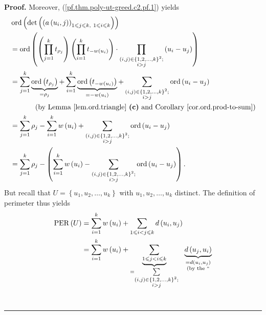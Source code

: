 \documentclass[numbers=enddot,12pt,final,onecolumn,notitlepage]{scrartcl}%
\theoremstyle{definition}
\newenvironment{proof}[1][Proof]{\noindent\textbf{#1.} }{\ \rule{0.5em}{0.5em}}
\let\sumnonlimits\sum
\let\prodnonlimits\prod
\renewcommand{\sum}{\sumnonlimits\limits}
\renewcommand{\prod}{\prodnonlimits\limits}
\renewcommand{\leq}{\leqslant}
\theoremstyle{plainsl}
\begin{document}
\begin{proof}
Moreover, (\ref{pf.thm.poly-ut-greed.c2.pf.1}) yields%
\begin{align}
&  \operatorname*{ord}\left(  \det\left(  \left(  a\left(  u_{i},j\right)
\right)  _{1\leq j\leq k,\ 1\leq i\leq k}\right)  \right) \nonumber\\
&  =\operatorname*{ord}\left(  \left(  \prod_{j=1}^{k}t_{\rho_{j}}\right)
\left(  \prod_{i=1}^{k}t_{-w\left(  u_{i}\right)  }\right)  \cdot
\prod_{\substack{\left(  i,j\right)  \in\left\{  1,2,\ldots,k\right\}
^{2};\\i>j}}\left(  u_{i}-u_{j}\right)  \right) \nonumber\\
&  =\sum_{j=1}^{k}\underbrace{\operatorname*{ord}\left(  t_{\rho_{j}}\right)
}_{=\rho_{j}}+\sum_{i=1}^{k}\underbrace{\operatorname*{ord}\left(
t_{-w\left(  u_{i}\right)  }\right)  }_{=-w\left(  u_{i}\right)  }%
+\sum_{\substack{\left(  i,j\right)  \in\left\{  1,2,\ldots,k\right\}
^{2};\\i>j}}\operatorname*{ord}\left(  u_{i}-u_{j}\right) \nonumber\\
&  \ \ \ \ \ \ \ \ \ \ \left(  \text{by Lemma \ref{lem.ord.triangle}
\textbf{(c)} and Corollary \ref{cor.ord.prod-to-sum}}\right) \nonumber\\
&  =\sum_{j=1}^{k}\rho_{j}-\sum_{i=1}^{k}w\left(  u_{i}\right)  +\sum
_{\substack{\left(  i,j\right)  \in\left\{  1,2,\ldots,k\right\}  ^{2}%
;\\i>j}}\operatorname*{ord}\left(  u_{i}-u_{j}\right) \nonumber\\
&  =\sum_{j=1}^{k}\rho_{j}-\left(  \sum_{i=1}^{k}w\left(  u_{i}\right)
-\sum_{\substack{\left(  i,j\right)  \in\left\{  1,2,\ldots,k\right\}
^{2};\\i>j}}\operatorname*{ord}\left(  u_{i}-u_{j}\right)  \right)  .
\label{pf.thm.poly-ut-greed.vp1}%
\end{align}
But recall that $U=\left\{  u_{1},u_{2},\ldots,u_{k}\right\}  $ with
$u_{1},u_{2},\ldots,u_{k}$ distinct. The definition of perimeter thus yields%
\begin{align}
\operatorname*{PER}\left(  U\right)   &  =\sum_{i=1}^{k}w\left(  u_{i}\right)
+\sum_{1\leq i<j\leq k}d\left(  u_{i},u_{j}\right) \nonumber\\
&  =\sum_{i=1}^{k}w\left(  u_{i}\right)  +\underbrace{\sum_{1\leq j<i\leq k}%
}_{=\sum_{\substack{\left(  i,j\right)  \in\left\{  1,2,\ldots,k\right\}
^{2};\\i>j}}}\ \ \underbrace{d\left(  u_{j},u_{i}\right)  }%
_{\substack{=d\left(  u_{i},u_{j}\right)  \\\text{(by the \textquotedblleft
}}}
\end{align}
\end{proof}
\end{document}
